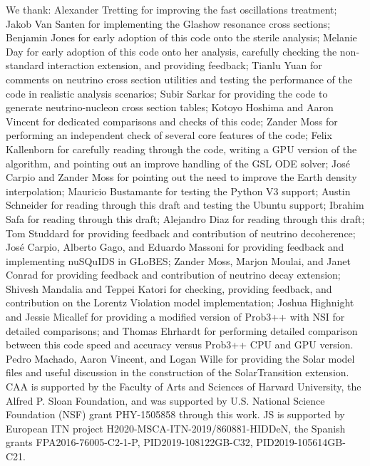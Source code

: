 \documentclass[3p,12pt]{elsarticle}
\begin{document}
We thank: Alexander Tretting for improving the fast oscillations treatment;
Jakob Van Santen for implementing the Glashow resonance cross sections;
Benjamin Jones for early adoption of this code onto the sterile analysis;
Melanie Day for early adoption of this code onto her analysis, carefully checking the non-standard interaction extension, and providing feedback;
Tianlu Yuan for comments on neutrino cross section utilities and testing the performance of the code in realistic analysis scenarios;
Subir Sarkar for providing the code to generate neutrino-nucleon cross section tables;
Kotoyo Hoshima and Aaron Vincent for dedicated comparisons and checks of this code;
Zander Moss for performing an independent check of several core features of the code;
Felix Kallenborn for carefully reading through the code, writing a GPU version of the algorithm, and pointing out an improve handling of the GSL ODE solver;
Jos\'e Carpio and Zander Moss for pointing out the need to improve the Earth density interpolation;
Mauricio Bustamante for testing the Python V3 support;
Austin Schneider for reading through this draft and testing the Ubuntu support;
Ibrahim Safa for reading through this draft;
Alejandro Diaz for reading through this draft;
Tom Studdard for providing feedback and contribution of neutrino decoherence;
Jos\'e Carpio, Alberto Gago, and Eduardo Massoni for providing feedback and implementing nuSQuIDS in GLoBES;
Zander Moss, Marjon Moulai, and Janet Conrad for providing feedback and contribution of neutrino decay extension;
Shivesh Mandalia and Teppei Katori for checking, providing feedback, and contribution on the Lorentz Violation model implementation;
Joshua Highnight and Jessie Micallef for providing a modified version of Prob3++ with NSI for detailed comparisons; and
Thomas Ehrhardt for performing detailed comparison between this code speed and accuracy versus Prob3++ CPU and GPU version.
Pedro Machado, Aaron Vincent, and Logan Wille for providing the Solar model files and useful discussion in the construction of the SolarTransition extension.
CAA is supported by the Faculty of Arts and Sciences of Harvard University, the Alfred P. Sloan Foundation, and was supported by U.S. National Science Foundation (NSF) grant PHY-1505858 through this work.
JS is supported by  European ITN project H2020-MSCA-ITN-2019/860881-HIDDeN, the Spanish grants FPA2016-76005-C2-1-P, 
PID2019-108122GB-C32, PID2019-105614GB-C21.




\appendix
\end{document}
